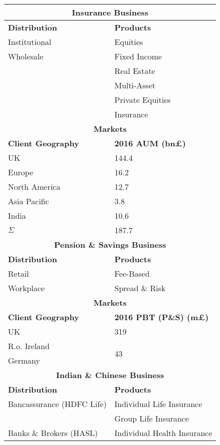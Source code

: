 \documentclass[11pt, english]{article}
\begin{document}
\newpage

\begin{center}
	\scriptsize
\begin{longtable}{p{5cm}p{6cm}}
	\hline
	\hline
	\multicolumn{2}{c}{\textbf{Insurance Business}}\\
	\hline
	\hline
	\textbf{Distribution} & \textbf{Products}\\
	\hline
	Institutional & Equities\\
	Wholesale & Fixed Income\\
	& Real Estate\\
	& Multi-Asset\\
	& Private Equities\\
	& Insurance\\
	\hline
	\multicolumn{2}{c}{\textbf{Markets}}\\
	\hline
	\textbf{Client Geography} & \textbf{2016 AUM (bn\pounds)}\\
	\hline
	UK & 144.4\\
	Europe & 16.2\\
	North America & 12.7\\
	Asia Pacific & 3.8\\
	India & 10.6\\
	\hline
	$\Sigma$ & 187.7\\
	\hline
	\hline
	\multicolumn{2}{c}{\textbf{Pension \& Savings Business}}\\
	\hline
	\hline
	\textbf{Distribution} & \textbf{Products}\\
        \hline
	Retail & Fee-Based\\
	Workplace & Spread \& Risk\\
	\hline
        \multicolumn{2}{c}{\textbf{Markets}}\\
        \hline
	\textbf{Client Geography} & \textbf{2016 PBT (P\&S) (m\pounds)}\\
	\hline
	UK & 319\\
	R.o. Ireland & \multirow{2}{*}{43}\\
	Germany & \\
	\hline
        \hline
	\multicolumn{2}{c}{\textbf{Indian \& Chinese Business}}\\
        \hline
        \hline
	\textbf{Distribution} & \textbf{Products}\\
        \hline
	Bancassurance (HDFC Life) & Individual Life Insurance\\
	& Group Life Insurance\\
	Banks \& Brokers (HASL) & Individual Health Insurance\\

\end{longtable}
\end{center}
\end{document}

